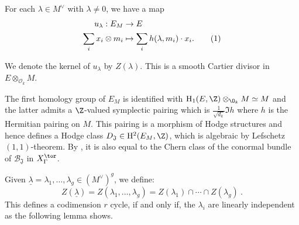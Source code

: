 \documentclass[11pt,letterpaper,english]{amsart}
\numberwithin{equation}{subsection}
\numberwithin{equation}{section}
\newcommand\numberthis{\addtocounter{equation}{1}\tag{\theequation}}
\newcommand\cB{{\mathcal B}}
\newcommand\cO{{\mathcal O}}
\newcommand\fJ{{\mathfrak J}}
\theoremstyle{plain}
\theoremstyle{remark}
\begin{document}
For each $\lambda\in M^\vee$ with $\lambda\neq 0$, we have a map 
\begin{align*}
    u_\lambda:E_M&\rightarrow E\\
    \sum_{i}x_i\otimes m_i &\mapsto \sum_{i}h(\lambda,m_i)\cdot x_i.\numberthis \label{eq:pullback-morphism}
\end{align*}

We denote the kernel of $u_{\lambda}$ by $Z(\lambda)$. This is a smooth Cartier divisor in $E\otimes_{\cO_k} M$.  

 The first homology group of $E_M$ is identified with $\mathrm{H}_1(E,\Z)\otimes_{\O_k} M\simeq M$ and the latter admits a $\Z$-valued symplectic pairing which is $\frac{1}{\sqrt{d_k}}\Im h$ where  $h$ is the Hermitian pairing on $M$. This pairing is a morphism of Hodge structures and hence defines a Hodge class $D_{\fJ}\in \mathrm{H}^2(E_M,\Z)$, which is algebraic by Lefschetz $(1,1)$-theorem.   By , it is also equal to the Chern class of the conormal bundle of $\cB_\fJ$ in $X_\Gamma^{\tor}$.

\medskip 


Given $\underline\lambda=\lambda_1,\ldots,\lambda_g\in (M^\vee)^g$, we define:  
\[Z(\underline \lambda)=Z(\lambda_1,\ldots,\lambda_g)=Z(\lambda_1)\cap\cdots\cap Z(\lambda_g)~.\] This defines a codimension $r$ cycle, if and only if, the $\lambda_i$ are linearly independent as the following lemma shows. 
\end{document}
